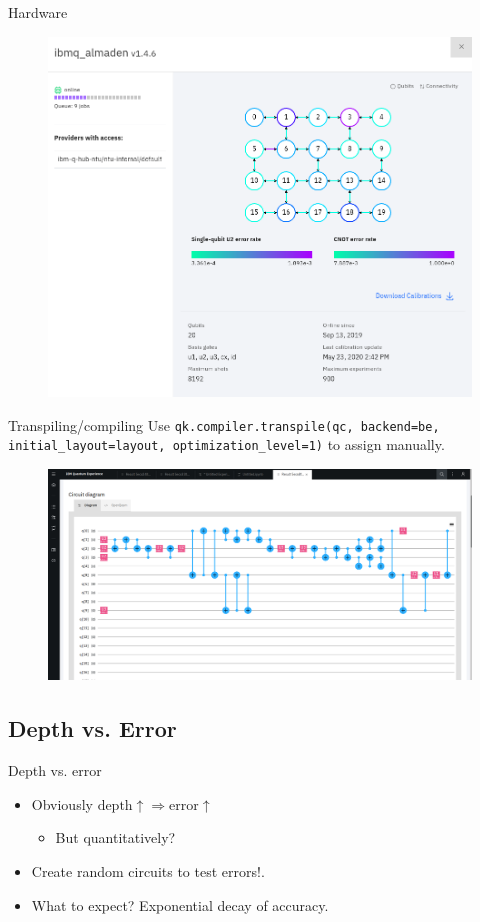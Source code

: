 \documentclass{beamer}
\begin{document}
\begin{frame}{Hardware}
	\begin{figure}[h]
		\centering
		\includegraphics[width=0.8\linewidth]{./figs/hardwareexample.png}
	\end{figure}
\end{frame}

\begin{frame}{Transpiling/compiling}
	Use \texttt{qk.compiler.transpile(qc, backend=be, initial\_layout=layout,
	optimization\_level=1)} to assign manually.
	\begin{figure}[h]
		\centering
		\includegraphics[width=\linewidth]{./figs/circuitdiagramexample.png}
	\end{figure}
\end{frame}

\subsection{Depth vs. Error}%
\label{sub:depth_vs_error}

\begin{frame}{Depth vs. error}
	\begin{itemize}
		\item Obviously $\text{depth}\uparrow \Rightarrow \text{error} \uparrow$
			\begin{itemize}
				\item But quantitatively?
			\end{itemize}
		\item Create random circuits to test errors!.
		\item What to expect? Exponential decay of accuracy.
	\end{itemize}
\end{frame}
\end{document}
